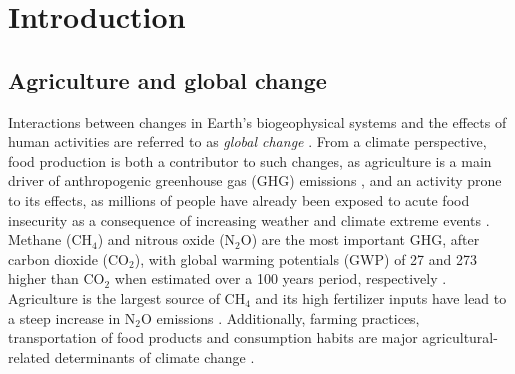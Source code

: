 \chapter*{\Huge Introduction}
\thispagestyle{thesis} %

\section*{Agriculture and global change}

Interactions between changes in Earth's biogeophysical systems and the effects of human activities are referred to as \textit{global change} \citep{national2001global}. From a climate perspective, food production is both a contributor to such changes, as agriculture is a main driver of anthropogenic greenhouse gas (GHG) emissions \citep{lenka2015, chataut2023}, and an activity prone to its effects, as millions of people have already been exposed to acute food insecurity as a consequence of increasing weather and climate extreme events \citep{fao2022b}. Methane (CH$_{4}$) and nitrous oxide (N$_{2}$O) are the most important GHG, after carbon dioxide (CO$_{2}$), with global warming potentials (GWP) of 27 and 273 higher than CO$_{2}$ when estimated over a 100 years period, respectively \citep{IPCC2021}. Agriculture is the largest source of CH$_{4}$ and its high fertilizer inputs have lead to a steep increase in N$_{2}$O emissions \citep{IPCC2007}. Additionally, farming practices, transportation of food products and consumption habits are major agricultural-related determinants of climate change \citep{balogh2020}.\\ %

